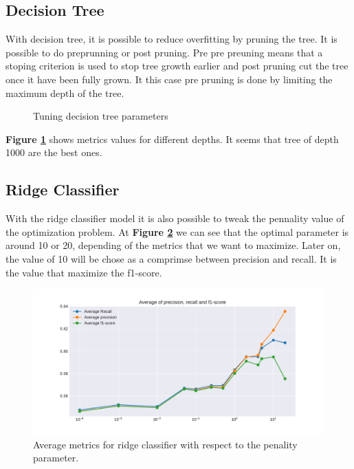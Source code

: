 \subsection{Decision Tree}
With decision tree, it is possible to reduce overfitting by pruning the tree. It is possible to do preprunning or post pruning. Pre pre preuning means that a stoping criterion is used to stop tree growth earlier and post pruning cut the tree once it have been fully grown. It this case pre pruning is done by limiting the maximum depth of the tree. 

\begin{figure}[]
	\centering
	\caption{Tuning decision tree parameters }
	\label{fig:chap3:dt}
\end{figure}

\textbf{Figure \ref{fig:chap3:dt}} shows metrics values for different depths. It seems that tree of depth 1000 are the best ones.
\subsection{Ridge Classifier}
With the ridge classifier model it is also possible to tweak the pennality value of the optimization problem. At \textbf{Figure \ref{fig:chap3:ridge1}} we can see that the optimal parameter is around 10 or 20, depending of the metrics that we want to maximize. Later on, the value of 10 will be chose as a comprimse between precision and recall. It is the value that maximize the f1-score. 

\begin{figure}
	\centering
	\includegraphics[width=1\textwidth]{images/chapitre3/liar-ridge}
	\caption{Average metrics for ridge classifier with respect to the penality parameter.}
	\label{fig:chap3:ridge1}
\end{figure} 
